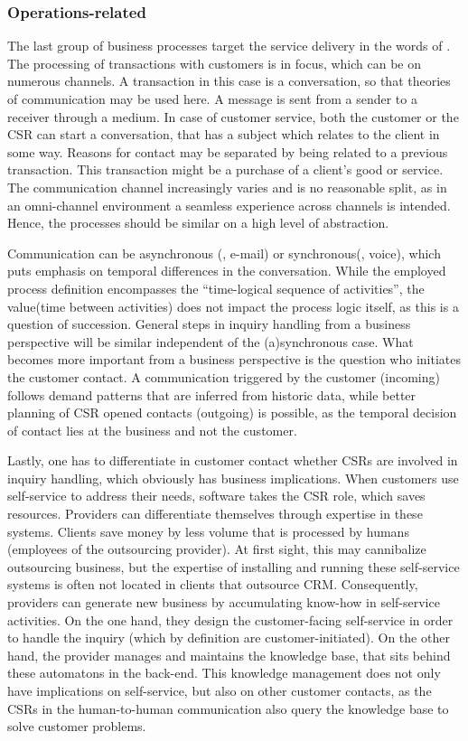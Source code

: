 	\subsubsection{Operations-related}
	The last group of business processes target the service delivery in the words of \citeauthor{schewe2007}. The processing of transactions with customers is in focus, which can be on numerous channels. A transaction in this case is a conversation, so that theories of communication \citep{shannon1949} may be used here.  A message is sent from a sender to a receiver through a medium. In case of customer service, both the customer or the \acrshort{CSR} can start a conversation, that has a subject which relates to the client in some way. Reasons for contact may be separated by being related to a previous transaction. This transaction might be a purchase of a client's good or service. The communication channel increasingly varies and is no reasonable split, as in an omni-channel environment a seamless experience across channels is intended. Hence, the processes should be similar on a high level of abstraction. 
	
	Communication can be asynchronous (\eg, e-mail) or synchronous(\eg, voice), which puts emphasis on temporal differences in the conversation. While the employed process definition encompasses the \enquote{time-logical sequence of activities}, the value(\viz time between activities) does not impact the process logic itself, as this is a question of succession. General steps in inquiry handling from a business perspective will be similar independent of the (a)synchronous case. What becomes more important from a business perspective is the question who initiates the customer contact. A communication triggered by the customer (incoming) follows demand patterns that are inferred from historic data, while better planning of \acrshort{CSR} opened contacts (outgoing) is possible, as the temporal decision of contact lies at the business and not the customer. 
	
	Lastly, one has to differentiate in customer contact whether \acrshort{CSR}s are involved in inquiry handling, which obviously has business implications. When customers use self-service to address their needs, software takes the \acrshort{CSR} role, which saves resources. Providers can differentiate themselves through expertise in these systems. Clients save money by less volume that is processed by humans (employees of the outsourcing provider). At first sight, this may cannibalize outsourcing business, but the expertise of installing and running these self-service systems is often not located in clients that outsource \acrshort{CRM}. Consequently, providers can generate new business by accumulating know-how in self-service activities. On the one hand, they design the customer-facing self-service in order to handle the inquiry (which by definition are customer-initiated). On the other hand, the provider manages and maintains the knowledge base, that sits behind these automatons in the back-end. This knowledge management does not only have implications on self-service, but also on other customer contacts, as the \acrshort{CSR}s in the human-to-human communication also query the knowledge base to solve customer problems.  
	
